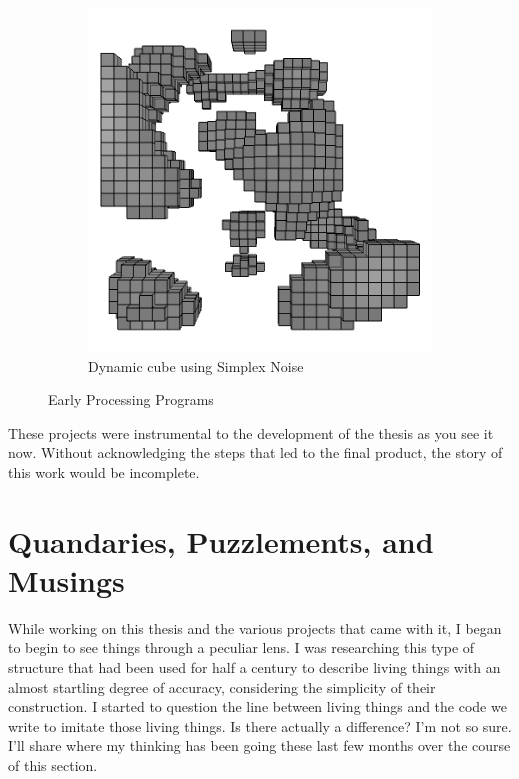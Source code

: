 \documentclass[12pt,twoside]{reedthesis}
\begin{document}
\begin{figure}[H]
\begin{subfigure}{0.48\linewidth}
		\includegraphics[width=\linewidth]{Images/SimplexImage}
		\caption{Dynamic cube using Simplex Noise}
		\label{Simplex}
	\end{subfigure}
	\caption{Early Processing Programs}
	\label{EarlyProcessing}
	\end{figure}
	
	These projects were instrumental to the development of the thesis as you see it now. Without acknowledging the steps that led to the final product, the story of this work would be incomplete.

\section{Quandaries, Puzzlements, and Musings}
\label{Questions}

	While working on this thesis and the various projects that came with it, I began to begin to see things through a peculiar lens. I was researching this type of structure that had been used for half a century to describe living things with an almost startling degree of accuracy, considering the simplicity of their construction. I started to question the line between living things and the code we write to imitate those living things. Is there actually a difference? I'm not so sure. I'll share where my thinking has been going these last few months over the course of this section.
	
\end{document}
